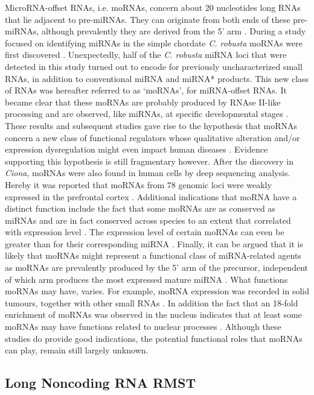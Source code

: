 \documentclass[graybox]{svmult}
\begin{document}
MicroRNA-offset RNAs, i.e. moRNAs, concern about $20$ nucleotides long RNAs 
that lie adjacent to pre-miRNAs. They can originate from both ends of these 
pre-miRNAs, although prevalently they are derived from the 5' arm 
\cite{bortoluzzi2011}. During a study focused on identifying miRNAs in the 
simple chordate \textit{C. robusta} moRNAs were first discovered 
\cite{Shi2009}. Unexpectedly, half of the \textit{C. robusta} miRNA loci 
that were detected in this study turned out to encode for 
previously uncharacterized small RNAs, in addition to conventional miRNA and 
miRNA* products. This new class of RNAs was hereafter referred to as `moRNAs', 
for miRNA-offset RNAs. It became clear that these moRNAs are probably produced 
by RNAse II-like processing and are observed, like miRNAs, at specific 
developmental stages \cite{Shi2009}.
These results and subsequent studies gave rise to the hypothesis that moRNAs 
concern  a new class of functional regulators whose qualitative alteration 
and/or expression dysregulation might even impact human diseases 
\cite{bortoluzzi2011}. Evidence supporting this hypothesis is still fragmentary 
however. After the discovery in \textit{Ciona}, moRNAs were 
also found in human cells by deep sequencing analysis. Hereby it was reported 
that moRNAs from $78$ genomic loci were weakly expressed in the prefrontal 
cortex \cite{Langenberger2009}. Additional indications that moRNA have a 
distinct function include the fact that some moRNAs are as conserved as miRNAs 
and are in fact conserved across species to an extent that correlated with 
expression level \cite{Shi2009}. The expression level of certain moRNAs can 
even be greater than for their corresponding miRNA \cite{Umbach2010}. Finally, 
it can be argued \cite{bortoluzzi2011} that it is likely that moRNAs might 
represent a functional class of miRNA-related agents as moRNAs are prevalently 
produced by the 5' arm of the precursor, independent of which arm produces the 
most expressed mature miRNA \cite{Langenberger2009, Umbach2010}. 
What functions moRNAs may have, varies. For example, moRNA expression was 
recorded in solid tumours, together with other small RNAs \cite{Meiri2010}. 
In addition the fact that an 18-fold enrichment of moRNAs was observed in the 
nucleus 
\cite{Taft2010} indicates that at least some moRNAs may have functions related 
to nuclear processes \cite{bortoluzzi2011}. Although these studies do provide 
good indications, the potential functional roles that moRNAs can play, remain 
still largely unknown. 

\subsection{Long Noncoding RNA RMST}
\end{document}

